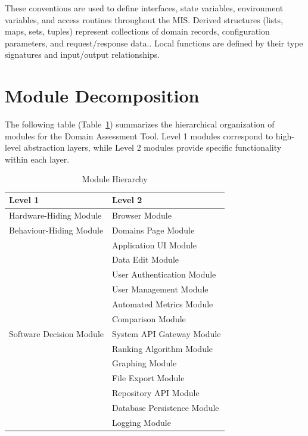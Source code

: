 \documentclass[12pt, titlepage]{article}
\begin{document}
\noindent
These conventions are used to define interfaces, state variables, environment variables, and access routines throughout the MIS. Derived structures (lists, maps, sets, tuples) represent collections of domain records, configuration parameters, and request/response data.. Local functions are defined by their type signatures and input/output relationships.


\section{Module Decomposition}

The following table (Table~\ref{tab:module-hierarchy}) summarizes the hierarchical organization of modules for the Domain Assessment Tool.
Level 1 modules correspond to high-level abstraction layers, while Level 2 modules provide specific functionality within each layer.

\begin{table}[H]
\centering
\caption{Module Hierarchy}
\label{tab:module-hierarchy}
\setlength{\tabcolsep}{10pt}
\renewcommand{\arraystretch}{1.2}
\begin{tabularx}{\textwidth}{l X}
\toprule
\textbf{Level 1} & \textbf{Level 2} \\
\midrule
Hardware-Hiding Module & Browser Module \\
\midrule
Behaviour-Hiding Module &
Domains Page Module \\
& Application UI Module \\
& Data Edit Module \\
& User Authentication Module \\
& User Management Module \\
& Automated Metrics Module \\
& Comparison Module \\
\midrule
Software Decision Module &
System API Gateway Module \\
& Ranking Algorithm Module \\
& Graphing Module \\
& File Export Module \\
& Repository API Module \\
& Database Persistence Module \\
& Logging Module \\
\bottomrule
\end{tabularx}
\end{table}

\newpage
\end{document}
